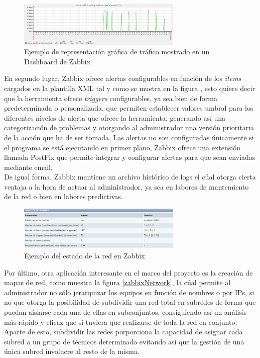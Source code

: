 \begin{figure}[H]
	\centering
	\includegraphics[width=0.7\textwidth]{img/zabbix_measure.png}
	\caption{Ejemplo de representación gráfica de tráfico mostrado en un Dashboard de Zabbix}
	\label{zabbixMeasure}
\end{figure}

En segundo lugar, Zabbix ofrece alertas configurables en función de los \textit{items} cargados en la plantilla XML tal y como se muetra en la figura , esto quiere decir que la herramienta ofrece \textit{triggers} configurables, ya sea bien de forma predeterminada o personalizada, que permiten establecer valores umbral para los diferentes niveles de alerta que ofrece la herramienta, generando así una categorización de problemas y otorgando al administrador una versión prioritaria de la acción que ha de ser tomada. Las alertas no son configuradas únicamente si el programa se está ejecutando en primer plano, Zabbix ofrece una extensión llamada PostFix \cite{PostFix} que permite integrar y configurar alertas para que sean enviadas mediante email.\\
De igual forma, Zabbix mantiene un archivo histórico de logs el cúal otorga cierta ventaja a la hora de actuar al administrador, ya sea en labores de mantemiento de la red o bien en labores predictivas. 

\begin{figure}[H]
	\centering
	\includegraphics[width=0.7\textwidth]{img/zabbix_resume.png}
	\caption{Ejemplo del estado de la red en Zabbix}
	\label{zabbixResume}
\end{figure}

Por último, otra aplicación interesante en el marco del proyecto es la creación de mapas de red, como muestra la figura \ref{zabbixNetwork}, la cúal permite al administrador no sólo jerarquizar los equipos en función de nombres o por IPs, si no que otorga la posibilidad de subdividir una red total en subredes de forma que puedan aislarse cada una de ellas en subconjuntos, consiguiendo así un análisis más rápido y eficaz que si tuviera que realizarse de toda la red en conjunto. Aparte de esto, subdividir las redes porporciona la capacidad de asignar cada subred a un grupo de técnicos determinado evitando así que la gestión de una única subred involucre al resto de la misma.

